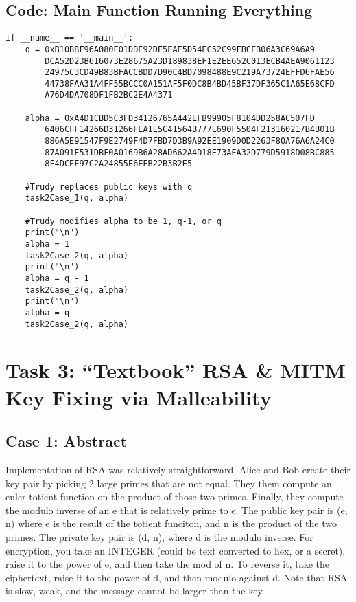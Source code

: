\documentclass[11pt]{article}
\begin{document}
\subsection*{Code: Main Function Running Everything}

\begin{lstlisting}
if __name__ == '__main__':
    q = 0xB10B8F96A080E01DDE92DE5EAE5D54EC52C99FBCFB06A3C69A6A9
		DCA52D23B616073E28675A23D189838EF1E2EE652C013ECB4AEA9061123
		24975C3CD49B83BFACCBDD7D90C4BD7098488E9C219A73724EFFD6FAE56
		44738FAA31A4FF55BCCC0A151AF5F0DC8B4BD45BF37DF365C1A65E68CFD
		A76D4DA708DF1FB2BC2E4A4371

    alpha = 0xA4D1CBD5C3FD34126765A442EFB99905F8104DD258AC507FD
		6406CFF14266D31266FEA1E5C41564B777E690F5504F213160217B4B01B
		886A5E91547F9E2749F4D7FBD7D3B9A92EE1909D0D2263F80A76A6A24C0
		87A091F531DBF0A0169B6A28AD662A4D18E73AFA32D779D5918D08BC885
		8F4DCEF97C2A24855E6EEB22B3B2E5

    #Trudy replaces public keys with q
    task2Case_1(q, alpha)

    #Trudy modifies alpha to be 1, q-1, or q
    print("\n")
    alpha = 1
    task2Case_2(q, alpha)
    print("\n")
    alpha = q - 1
    task2Case_2(q, alpha)
    print("\n")
    alpha = q   
    task2Case_2(q, alpha)
\end{lstlisting}


\section*{Task 3: ``Textbook'' RSA \& MITM Key Fixing via Malleability}
\subsection*{Case 1: Abstract}

Implementation of RSA was relatively straightforward. Alice and Bob create their key pair by picking 2 large primes that are not equal. They them compute an euler totient function on the product of those two primes. Finally, they compute the modulo inverse of an e that is relatively prime to e. The public key pair is (e, n) where e is the result of the totient funciton, and n is the product of the two primes. The private key pair is (d, n), where d is the modulo inverse. For encryption, you take an INTEGER (could be text converted to hex, or a secret), raise it to the power of e, and then take the mod of n.  To reverse it, take the ciphertext, raise it to the power of d, and then modulo against d. Note that RSA is slow, weak, and the message cannot be larger than the key. 
\end{document}
